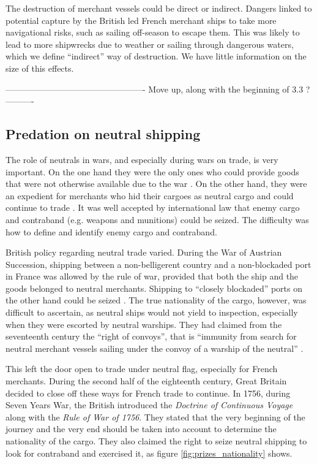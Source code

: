 \documentclass[12pt,a4paper,notitlepage,english]{article}
\begin{document}
The destruction of merchant vessels could be direct or indirect.
Dangers linked to potential capture by the British led French merchant ships to take more navigational risks, such as sailing off-season to escape them.
This was likely to lead to more shipwrecks due to weather or sailing through dangerous waters, which we define ``indirect'' way of destruction.
We have little information on the size of this effects.
 




-------------------------------------------------
Move up, along with the beginning of 3.3 ?
----------



\subsection{Predation on neutral shipping}
The role of neutrals in wars, and especially during wars on trade, is very important.
On the one hand they were the only ones who could provide goods that were not otherwise available due to the war \citep{Hedberg2015}.
On the other hand, they were an expedient for merchants who hid their cargoes as neutral cargo and could continue to trade \cite[see][]{Carriere1973,Schnakenbourg2013,Schnakenbourg2015}. 
It was well accepted by international law that enemy cargo and contraband (e.g. weapons and munitions) could be seized.
The difficulty was how to define and identify enemy cargo and contraband.

British policy regarding neutral trade varied.
During the War of Austrian Succession, shipping between a non-belligerent country and a non-blockaded port in France was allowed by the rule of war, provided that both the ship and the goods belonged to neutral merchants.
Shipping to ``closely blockaded'' ports on the other hand could be seized \citep[p. 112]{Schnakenbourg2013}.
The true nationality of the cargo, however, was difficult to ascertain, as neutral ships would not yield to inspection, especially when they were escorted by neutral warships.
They had claimed from the seventeenth century the ``right of convoys'', that is ``immunity from search for neutral merchant vessels sailing under the convoy of a warship of the neutral'' \citep{TheEditorsofEncyclopaediaBritannica2014}.

This left the door open to trade under neutral flag, especially for French merchants. 
During the second half of the eighteenth century, Great Britain decided to close off these ways for French trade to continue. 
In 1756, during Seven Years War, the British introduced the \textit{Doctrine of Continuous Voyage} along with the \textit{Rule of War of 1756}.
They stated that the very beginning of the journey and the very end should be taken into account to determine the nationality of the cargo. They also claimed the right to seize neutral shipping to look for contraband and exercised it, as figure \ref{fig:prizes_nationality} shows.
\end{document}
